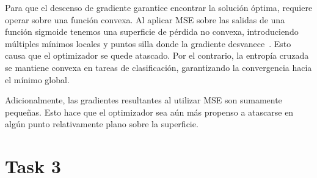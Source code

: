 \documentclass[11pt]{article}
\begin{document}
\begin{enumerate}[label=\alph*.]
    Para que el descenso de gradiente garantice encontrar la solución óptima, requiere operar sobre una función convexa. Al aplicar MSE sobre las
    salidas de una función sigmoide tenemos una superficie de pérdida no convexa, introduciendo múltiples mínimos locales y puntos silla
    donde la gradiente desvanece~\cite{merida2026lab02}. Esto causa que el optimizador se quede atascado. Por el contrario, la entropía
    cruzada se mantiene convexa en tareas de clasificación, garantizando la convergencia hacia el mínimo global.

    Adicionalmente, las gradientes resultantes al utilizar MSE son sumamente pequeñas. Esto hace que el optimizador sea aún más propenso a atascarse
    en algún punto relativamente plano sobre la superficie.
\end{enumerate}

\section*{Task 3}
\end{document}
